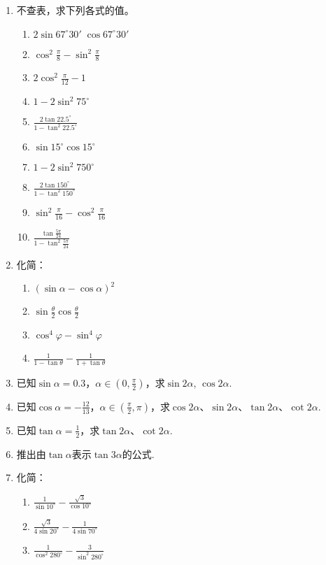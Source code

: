 \begin{enumerate}
    \item 不查表，求下列各式的值。
\begin{multicols}{2}
\begin{enumerate}[(1)]
    \item $2\sin67^{\circ}30'\; \cos67^{\circ}30'$
    \item $\cos^2\frac{\pi}{8}-\sin^2\frac{\pi}{8}$
    \item $2\cos^2\frac{\pi}{12}-1$
    \item $1-2\sin^2 75^{\circ}$
    \item $\frac{2\tan 22.5^{\circ}}{1-\tan^2 22.5^{\circ}}$
    \item $\sin 15^{\circ}\cos 15^{\circ}$
    \item $1-2\sin^2 750^{\circ}$
    \item $\frac{2\tan150^{\circ}}{1-\tan^2 150^{\circ}}$
    \item $\sin^2\frac{\pi}{16}-\cos^2\frac{\pi}{16}$
    \item $\frac{\tan\frac{5\pi}{24}}{1-\tan^2\frac{5\pi}{24}}$
\end{enumerate}
\end{multicols}

\item 化简：
\begin{multicols}{2}
\begin{enumerate}[(1)]
    \item $(\sin\alpha-\cos\alpha)^2$
    \item $\sin\frac{\theta}{2}\cos\frac{\theta}{2}$
    \item $\cos^4\varphi -\sin^4\varphi$
    \item $\frac{1}{1-\tan\theta}-\frac{1}{1+\tan\theta}$
\end{enumerate}
\end{multicols}

\item 已知$\sin\alpha=0.3$，$\alpha\in\left(0,\frac{\pi}{2}\right)$，求$\sin2\alpha$, $\cos2\alpha$.
\item 已知$\cos\alpha=-\frac{12}{13}$，$\alpha\in\left(\frac{\pi}{2},\pi\right)$，求$\cos2\alpha$、$\sin2\alpha$、$\tan2\alpha$、$\cot2\alpha$.

\item 已知$\tan\alpha=\frac{1}{2}$，求$\tan2\alpha$、$\cot2\alpha$.

\item 推出由$\tan\alpha$表示$\tan3\alpha$的公式.
\item 化简：
\begin{multicols}{2}
\begin{enumerate}[(1)]
    \item $\frac{1}{\sin10^{\circ}}-\frac{\sqrt{3}}{\cos10^{\circ}}$
    \item $\frac{\sqrt{3}}{4\sin 20^{\circ}}-\frac{1}{4\sin 70^{\circ}}$
    \item $\frac{1}{\cos^2 280^{\circ}}-\frac{3}{\sin^2 280^{\circ}}$
\end{enumerate}
\end{multicols}
    

\end{enumerate}
